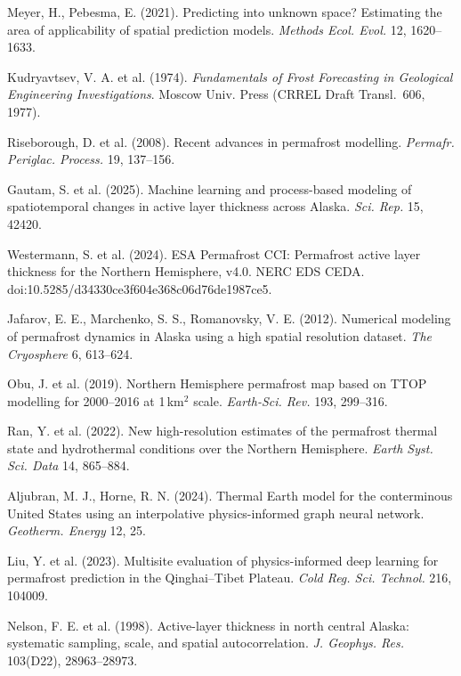 \documentclass[10pt,twocolumn]{article}
\begin{document}
{\begin{enumerate}[leftmargin=1.5em,itemsep=0pt,topsep=0pt,parsep=0pt,label={[\arabic*]}]
\item Meyer, H., Pebesma, E. (2021). Predicting into unknown space? Estimating the area of applicability of spatial prediction models. \textit{Methods Ecol. Evol.} 12, 1620--1633.
\item Kudryavtsev, V. A. et al. (1974). \textit{Fundamentals of Frost Forecasting in Geological Engineering Investigations}. Moscow Univ. Press (CRREL Draft Transl.\ 606, 1977).
\item Riseborough, D. et al. (2008). Recent advances in permafrost modelling. \textit{Permafr. Periglac. Process.} 19, 137--156.
\item Gautam, S. et al. (2025). Machine learning and process-based modeling of spatiotemporal changes in active layer thickness across Alaska. \textit{Sci. Rep.} 15, 42420.
\item Westermann, S. et al. (2024). ESA Permafrost CCI: Permafrost active layer thickness for the Northern Hemisphere, v4.0. NERC EDS CEDA. doi:10.5285/d34330ce3f604e368c06d76de1987ce5.
\item Jafarov, E. E., Marchenko, S. S., Romanovsky, V. E. (2012). Numerical modeling of permafrost dynamics in Alaska using a high spatial resolution dataset. \textit{The Cryosphere} 6, 613--624.
\item Obu, J. et al. (2019). Northern Hemisphere permafrost map based on TTOP modelling for 2000--2016 at 1\,km$^2$ scale. \textit{Earth-Sci. Rev.} 193, 299--316.
\item Ran, Y. et al. (2022). New high-resolution estimates of the permafrost thermal state and hydrothermal conditions over the Northern Hemisphere. \textit{Earth Syst. Sci. Data} 14, 865--884.
\item Aljubran, M. J., Horne, R. N. (2024). Thermal Earth model for the conterminous United States using an interpolative physics-informed graph neural network. \textit{Geotherm. Energy} 12, 25.
\item Liu, Y. et al. (2023). Multisite evaluation of physics-informed deep learning for permafrost prediction in the Qinghai--Tibet Plateau. \textit{Cold Reg. Sci. Technol.} 216, 104009.
\item Nelson, F. E. et al. (1998). Active-layer thickness in north central Alaska: systematic sampling, scale, and spatial autocorrelation. \textit{J. Geophys. Res.} 103(D22), 28963--28973.
\end{enumerate}
}
\end{document}
